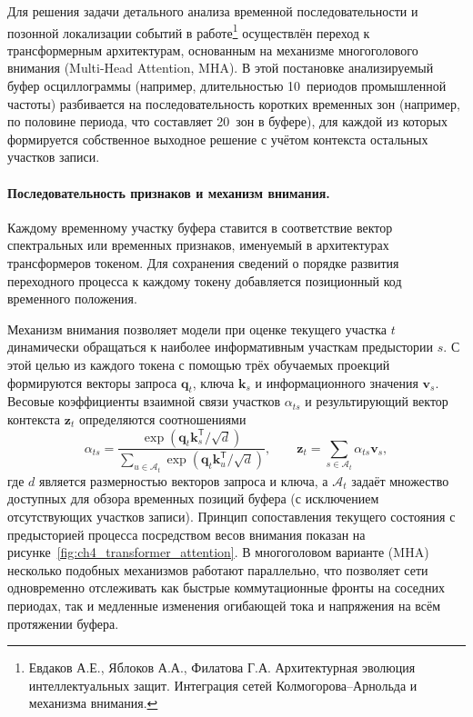 Для решения задачи детального анализа временной последовательности и
позонной локализации событий в работе\footnote{Евдаков А.Е., Яблоков А.А.,
Филатова Г.А. Архитектурная эволюция интеллектуальных защит. Интеграция
сетей Колмогорова--Арнольда и механизма внимания.} осуществлён переход к
трансформерным архитектурам, основанным на механизме многоголового
внимания (Multi-Head Attention, MHA). В этой постановке анализируемый
буфер осциллограммы (например, длительностью 10~периодов промышленной
частоты) разбивается на последовательность коротких временных зон
(например, по половине периода, что составляет 20~зон в буфере), для
каждой из которых формируется собственное выходное решение с учётом
контекста остальных участков записи.

\paragraph{Последовательность признаков и механизм внимания.}
Каждому временному участку буфера ставится в соответствие вектор
спектральных или временных признаков, именуемый в архитектурах
трансформеров токеном. Для сохранения сведений о порядке развития
переходного процесса к каждому токену добавляется позиционный код
временного положения.

Механизм внимания позволяет модели при оценке текущего участка $t$
динамически обращаться к наиболее информативным участкам предыстории $s$.
С этой целью из каждого токена с помощью трёх обучаемых проекций
формируются векторы запроса $\boldsymbol{q}_t$, ключа $\boldsymbol{k}_s$
и информационного значения $\boldsymbol{v}_s$. Весовые коэффициенты
взаимной связи участков $\alpha_{ts}$ и результирующий вектор контекста
$\boldsymbol{z}_t$ определяются соотношениями
\begin{equation}
    \alpha_{ts}=\frac{\exp\!\left(
    \boldsymbol{q}_t\boldsymbol{k}_s^{\mathsf T}/\sqrt{d}\right)}
    {\displaystyle\sum_{u\in\mathcal{A}_t}\exp\!\left(
    \boldsymbol{q}_t\boldsymbol{k}_u^{\mathsf T}/\sqrt{d}\right)},
    \qquad
    \boldsymbol{z}_t=\sum_{s\in\mathcal{A}_t}
    \alpha_{ts}\boldsymbol{v}_s,
    \label{eq:ch4_attention_weights}
\end{equation}
где $d$ является размерностью векторов запроса и ключа, а $\mathcal{A}_t$
задаёт множество доступных для обзора временных позиций буфера (с
исключением отсутствующих участков записи). Принцип сопоставления текущего
состояния с предысторией процесса посредством весов внимания показан на
рисунке~\ref{fig:ch4_transformer_attention}. В многоголовом варианте (MHA)
несколько подобных механизмов работают параллельно, что позволяет сети
одновременно отслеживать как быстрые коммутационные фронты на соседних
периодах, так и медленные изменения огибающей тока и напряжения на всём
протяжении буфера.

